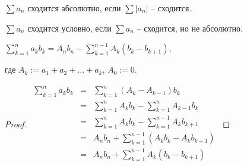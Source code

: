 \newpage
{}

\begin{definition} \thmslashn 

    $\sum a_n$ сходится абсолютно, если $\sum |a_n|$ -- сходится.
    
    $\sum a_n$ сходится условно, если $\sum a_n$ -- сходится, но не абсолютно.
    
\end{definition}

\begin{theorem} \thmslashn 

	$\sum\limits_{k=1}^{n} a_kb_k = A_nb_n - \sum\limits_{k=1}^{n-1} A_k(b_k - b_{k+1})$,
	
	где $A_k := a_1 + a_2 + \dotsc + a_k$, $A_0 := 0$.
	
	\begin{proof} \thmslashn
    
        $\begin{array}{rcll}
    	\sum\limits_{k=1}^{n} a_kb_k &=& \sum\limits_{k=1}^{n} (A_k - A_{k-1})b_k \\
    	                             &=& \sum\limits_{k=1}^{n} A_kb_k - \sum\limits_{k=1}^{n} A_{k-1}b_k \\
    	                             &=& \sum\limits_{k=1}^{n} A_kb_k - \sum\limits_{k=1}^{n-1} A_kb_{k+1} \\
    	                             &=& A_nb_n + \sum\limits_{k=1}^{n-1} (A_kb_k - A_kb_{k+1}) \\
    	                             &=& A_nb_n + \sum\limits_{k=1}^{n-1} A_k(b_k - b_{k+1}) \\
    	\end{array}$

    \end{proof}

\end{theorem}


